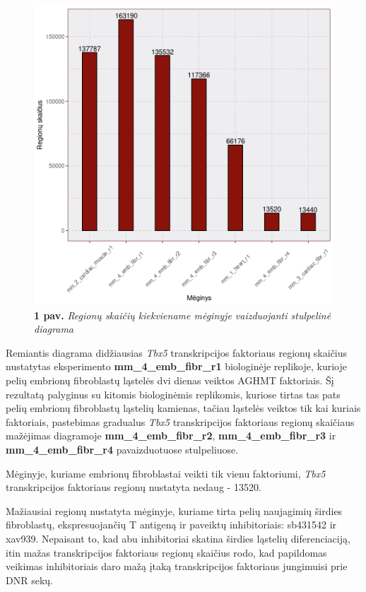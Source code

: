 \documentclass[12pt]{article}
\begin{document}
\begin{figure}[htb]
    \begin{center}
        \includegraphics[width=0.7\linewidth]{Figures/total_peak_counts.png}
        \caption*{\textbf{1 pav.} \emph{Regionų skaičių kiekviename mėginyje
        vaizduojanti stulpelinė diagrama}}
    \end{center}
\end{figure}

Remiantis diagrama didžiausias \emph{Tbx5} transkripcijos faktoriaus
regionų skaičius nustatytas eksperimento \textbf{mm\_4\_emb\_fibr\_r1}
biologinėje replikoje, kurioje pelių embrionų fibroblastų ląstelės
dvi dienas veiktos AGHMT faktoriais.
Šį rezultatą palyginus su kitomis biologinėmis replikomis, kuriose
tirtas tas pats pelių embrionų fibroblastų ląstelių kamienas, tačiau
ląstelės veiktos tik kai kuriais faktoriais, pastebimas gradualus
\emph{Tbx5} transkripcijos faktoriaus regionų skaičiaus mažėjimas
diagramoje \textbf{mm\_4\_emb\_fibr\_r2}, \textbf{mm\_4\_emb\_fibr\_r3} ir
\textbf{mm\_4\_emb\_fibr\_r4} pavaizduotuose stulpeliuose.

Mėginyje, kuriame embrionų fibroblastai veikti tik vienu faktoriumi,
\emph{Tbx5} transkripcijos faktoriaus regionų nustatyta nedaug -
13520.

Mažiausiai regionų nustatyta mėginyje, kuriame tirta pelių
naujagimių širdies fibroblastų, ekspresuojančių T antigeną
ir paveiktų inhibitoriais: sb431542 ir xav939.
Nepaisant to, kad abu inhibitoriai skatina širdies ląstelių
diferenciaciją\cite{HEART_CELL_DIFF_ARTCL}, itin mažas transkripcijos
faktoriaus regionų skaičius rodo, kad papildomas veikimas
inhibitoriais daro mažą įtaką transkripcijos faktoriaus
jungimuisi prie DNR sekų.
\end{document}
